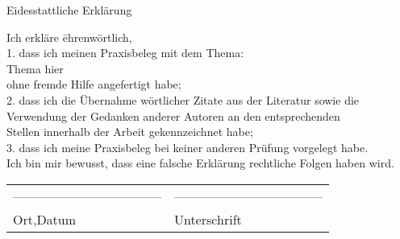 
	\begin{titlepage}
	
	
		\begin{bfseries}
			\begin{center}
				\Huge{Eidesstattliche Erklärung}\\[3cm]
			\end{center}
		\end{bfseries}
		
		\begin{tabbing}
		Ich erkläre \= ehrenwörtlich,\\[1cm]
		1. 	\> dass ich meinen Praxisbeleg mit dem Thema:\\[1cm]
		   	\> Thema hier\\[1cm]
		ohne fremde Hilfe angefertigt habe;\\[1cm]
		
		2.	\> dass ich die Übernahme wörtlicher Zitate aus der Literatur sowie die\\ 		  
			\>Verwendung der Gedanken anderer Autoren an den entsprechenden\\
			\> Stellen innerhalb der Arbeit gekennzeichnet habe;\\[0.5cm]
		
		3.	\> dass ich meine Praxisbeleg bei keiner anderen Prüfung vorgelegt habe. \\[1cm]
		Ich bin mir bewusst, dass eine falsche Erklärung rechtliche Folgen haben wird. \\[2cm]
		\end{tabbing}
		
		 \begin{tabular}{p{8cm}l}
		  ----------------------------------- &  ----------------------------------- \\
		  Ort,Datum & Unterschrift  \\
		 \end{tabular}
	\end{titlepage}